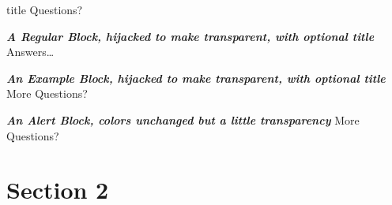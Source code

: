 \documentclass[aspectratio=1610]{beamer}
\begin{document}
\begin{NCARprettyframe}
  \vspace{3em}
  \begin{beamercolorbox}[sep=8pt,center]{title}
    \Huge{\textcolor{HilightGreen}{Questions?}}
  \end{beamercolorbox}
  \begin{block}{\emph{\textbf{A Regular Block, hijacked to make transparent, with optional title}}}
    \centering
    \Huge{Answers\ldots}
  \end{block}
  \begin{exampleblock}{\emph{\textbf{An Example Block, hijacked to make transparent, with optional title}}}
    \centering
    \Huge{More Questions?}
  \end{exampleblock}
  \begin{alertblock}{\emph{\textbf{An Alert Block, colors unchanged but a little transparency}}}
    \centering
    \Huge{More Questions?}
  \end{alertblock}
\end{NCARprettyframe}



\section{Section 2}
\end{document}
